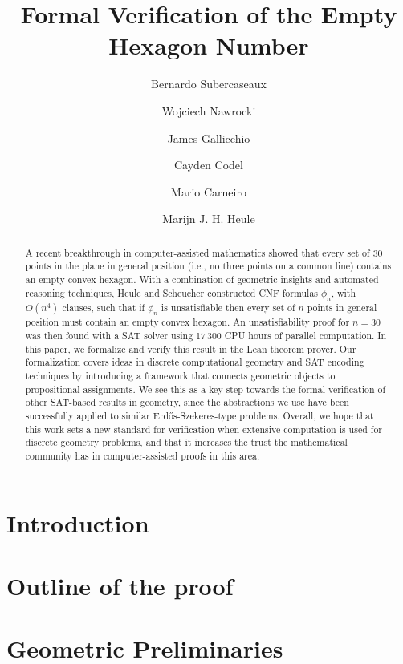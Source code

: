 \documentclass[a4paper, USenglish, cleveref, autoref, thm-restate]{lipics-v2021}
\title{\texorpdfstring{Formal Verification of the Empty Hexagon Number}{A Formal Verification of the Empty Hexagon Number}}%
\author{Bernardo {Subercaseaux}}{Carnegie Mellon University}{bsuberca@andrew.cmu.edu}{https://orcid.org/0000-0003-2295-1299}{}
\author{Wojciech {Nawrocki}}{Carnegie Mellon University}{wjnawrocki@cmu.edu}{https://orcid.org/0000-0002-8839-0618}{}
\author{James {Gallicchio}}{Carnegie Mellon University}{jgallicc@andrew.cmu.edu}{https://orcid.org/0000-0002-0838-3240}{}
\author{Cayden {Codel}}{Carnegie Mellon University}{ccodel@andrew.cmu.edu}{https://orcid.org/0000-0003-3588-4873}{}
\author{Mario {Carneiro}}{Carnegie Mellon University}{mcarneir@andrew.cmu.edu}{https://orcid.org/0000-0002-0470-5249}{}
\author{Marijn J. H. {Heule}}{Carnegie Mellon University}{mheule@andrew.cmu.edu}{https://orcid.org/0000-0002-5587-8801}{}
\begin{document}
\maketitle

\begin{abstract}
  A recent breakthrough in computer-assisted mathematics showed that every set of $30$ points in the plane in general position (i.e., no three points on a common line) contains an empty convex hexagon. %
  With a combination of geometric insights and automated reasoning techniques, Heule and Scheucher constructed CNF formulas $\phi_n$, with $O(n^4)$ clauses, such that if $\phi_n$ is unsatisfiable then every set of $n$ points in general position must contain an empty convex hexagon.
  An unsatisfiability proof for $n = 30$ was then found with a SAT solver using 17\,300 CPU hours of parallel computation. %
  In this paper, we formalize and verify this result in the Lean theorem prover. Our formalization covers ideas in discrete computational geometry and SAT encoding techniques by introducing a framework that connects geometric objects to propositional assignments.
  We see this as a key step towards the formal verification of other SAT-based results in geometry, since the abstractions we use have been successfully applied to similar Erd\H{o}s-Szekeres-type problems.
  Overall, we hope that this work sets a new standard for verification when extensive computation is used for discrete geometry problems, and that it increases the trust the mathematical community has in computer-assisted proofs in this area.
\end{abstract}


\section{Introduction}\label{sec:intro}


\section{Outline of the proof}\label{sec:outline}


\section{Geometric Preliminaries}\label{sec:geometry}

\end{document}
